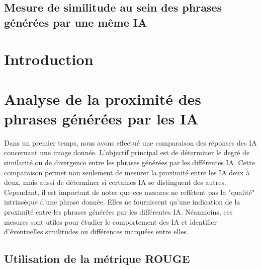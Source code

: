 \documentclass[conference]{IEEEtran}
\begin{document}
\subsection {Mesure de similitude au sein des phrases générées par une même IA}
\subsection {}
\subsection {}
\subsection {}

\section {Introduction}





\vspace{5mm}


\section{Analyse de la proximité des phrases générées par les IA}

Dans un premier temps, nous avons effectué une comparaison des réponses des IA concernant une image donnée. L'objectif principal est de déterminer le degré de similarité ou de divergence entre les phrases générées par les différentes IA. Cette comparaison permet non seulement de mesurer la proximité entre les IA deux à deux, mais aussi de déterminer si certaines IA se distinguent des autres.\\

Cependant, il est important de noter que ces mesures ne reflètent pas la "qualité" intrinsèque d'une phrase donnée. Elles ne fournissent qu'une indication de la proximité entre les phrases générées par les différentes IA. Néanmoins, ces mesures sont utiles pour étudier le comportement des IA et identifier d'éventuelles similitudes ou différences marquées entre elles.

\subsection{Utilisation de la métrique ROUGE}
\end{document}
